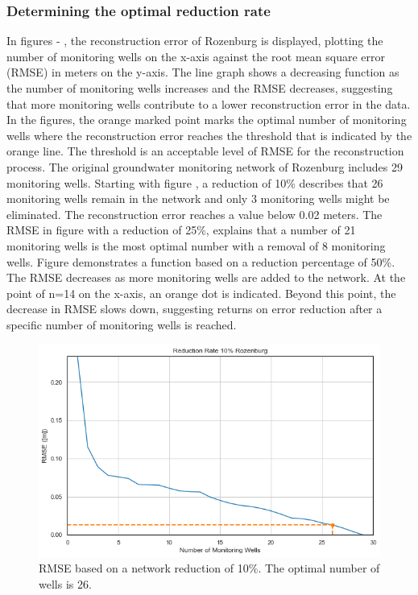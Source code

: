 \subsubsection{Determining the optimal reduction rate}
In figures  -  , the reconstruction error of Rozenburg is displayed, plotting the number of monitoring wells on the x-axis against the root mean square error (RMSE) in meters on the y-axis. The line graph shows a decreasing function as the number of monitoring wells increases and the RMSE decreases, suggesting that more monitoring wells contribute to a lower reconstruction error in the data. In the figures, the orange marked point marks the optimal number of monitoring wells where the reconstruction error reaches the threshold that is indicated by the orange line. The threshold is an acceptable level of RMSE for the reconstruction process. The original groundwater monitoring network of Rozenburg includes 29 monitoring wells.
\newline
Starting with figure , a reduction of 10\% describes that 26 monitoring wells remain in the network and only 3 monitoring wells might be eliminated. The reconstruction error reaches a value below 0.02 meters. The RMSE in figure  with a reduction of 25\%, explains that a number of 21 monitoring wells is the most optimal number with a removal of 8 monitoring wells.  Figure  demonstrates a function based on a reduction percentage of 50\%. The RMSE decreases as more monitoring wells are added to the network. At the point of n=14 on the x-axis, an orange dot is indicated. Beyond this point, the decrease in RMSE slows down, suggesting returns on error reduction after a specific number of monitoring wells is reached. 

\begin{figure}[htbp]
    \centering
    \includegraphics[width=0.48\linewidth]{frontmatter/Rozenburg-fig/new10.png}
    \caption{RMSE based on a network reduction of 10\%. The optimal number of wells is 26.}
    \label{roz10}
\end{figure}


